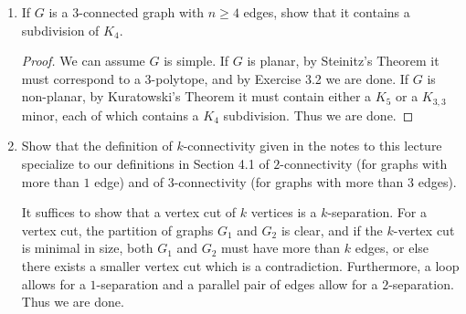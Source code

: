 \documentclass{article}
\begin{document}
\begin{enumerate}
\begin{solution}
\begin{figure}[h]

\caption{$K_{3,3}$ and $K'_{3,3}$ with labeled vertices.}
\end{figure}

We show that $K_6$ is not $\dy$-reducible. 

Clearly $K_{m,n}$ for $m,n \geq 4$ is irreducible because there are no moves ($\dy, \yd, S, P$) which one can perform on it. 

\end{solution}

\item If $G$ is a $3$-connected graph with $n \ge 4$ edges, show that it contains a subdivision of $K_{4}$.

\begin{proof}
    We can assume $G$ is simple. If $G$ is planar, by Steinitz's Theorem it must correspond to a $3$-polytope, and by Exercise 3.2 we are done. If $G$ is non-planar, by Kuratowski's Theorem it must contain either a $K_5$ or a $K_{3,3}$ minor, each of which contains a $K_4$ subdivision. Thus we are done.
\end{proof}

\item Show that the definition of $k$-connectivity given in the notes to this lecture specialize to our definitions in Section 4.1 of $2$-connectivity (for graphs with more than $1$ edge) and of $3$-connectivity (for graphs with more than $3$ edges).

\begin{solution}
It suffices to show that a vertex cut of $k$ vertices is a $k$-separation. For a vertex cut, the partition of graphs $G_1$ and $G_2$ is clear, and if the $k$-vertex cut is minimal in size, both $G_1$ and $G_2$ must have more than $k$ edges, or else there exists a smaller vertex cut which is a contradiction. Furthermore, a loop allows for a $1$-separation and a parallel pair of edges allow for a $2$-separation. Thus we are done.
\end{solution}


\end{enumerate}
\end{document}
